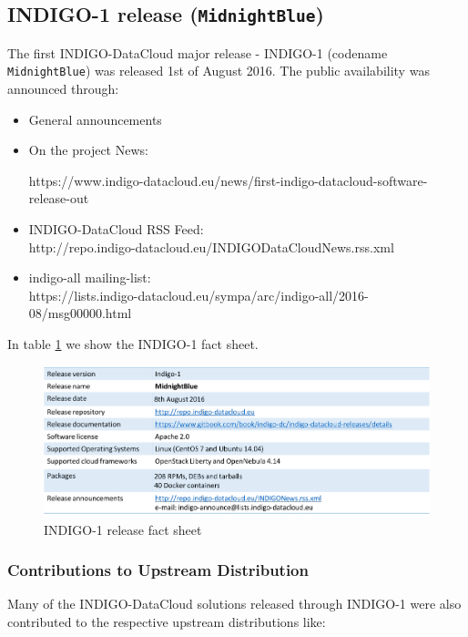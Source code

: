 \documentclass{article}
\begin{document}
\subsection{INDIGO-1 release ({\tt MidnightBlue})}

The first INDIGO-DataCloud major release - INDIGO-1 (codename {\tt MidnightBlue}) was released 1st of August 2016. The public availability was announced through:

\begin{itemize}
\item General announcements
\item On the project News:

https://www.indigo-datacloud.eu/news/first-indigo-datacloud-software-release-out
\item INDIGO-DataCloud RSS Feed:\\
http://repo.indigo-datacloud.eu/INDIGODataCloudNews.rss.xml
\item indigo-all mailing-list:\\
https://lists.indigo-datacloud.eu/sympa/arc/indigo-all/2016-08/msg00000.html
\end{itemize}

In table \ref{tab:1} we show the INDIGO-1 fact sheet.

\begin{figure}
  \centering
  \includegraphics[width=\textwidth]{./figs/TableI.pdf}
  \caption{INDIGO-1 release fact sheet}
  \label{tab:1}
\end{figure}

\subsubsection{Contributions to Upstream Distribution}

Many of the INDIGO-DataCloud solutions released through INDIGO-1 were also contributed to the respective upstream distributions like:
\end{document}
